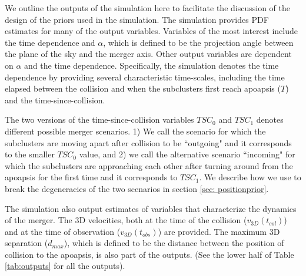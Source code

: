 We outline the outputs of the simulation here to facilitate the discussion
of the design of the priors used in the simulation. The simulation
provides PDF estimates for many of the output variables. Variables
of the most interest include the time dependence and $\alpha$, which is
defined to be the projection angle between the plane of the sky and the merger axis. Other output variables are dependent on $\alpha$ and the time
dependence. Specifically, the simulation denotes the time dependence by
providing several characteristic time-scales, including the time
elapsed between the collision and when the subclusters first reach apoapsis
($T$) and the time-since-collision.  

The two versions of the time-since-collision variables $TSC_0$ and
$TSC_1$ denotes different possible merger scenarios. 1) We call the scenario for which the subclusters are
moving apart after collision to be ``outgoing" and it corresponds to the
smaller $TSC_0$ value, and 2) we call the alternative scenario 
``incoming" for which the subclusters are approaching each other after turning
around from the apoapsis for the first time and it corresponds to $TSC_1$.
We describe how we use to break the degeneracies of the two scenarios in
section \ref{sec: positionprior}. 
 
The simulation also output estimates of variables that characterize
the dynamics of the merger. The 3D velocities, both at the time of the
collision ($v_{3D}(t_{col})$) and at the time of observation
($v_{3D}(t_{obs})$) are provided. The maximum 3D separation ($d_{max}$),
which is defined to be the distance between the position of collision to
the apoapsis, is also part of
the outputs. (See the lower half of Table \ref{tab:outputs} for all the outputs).
%

